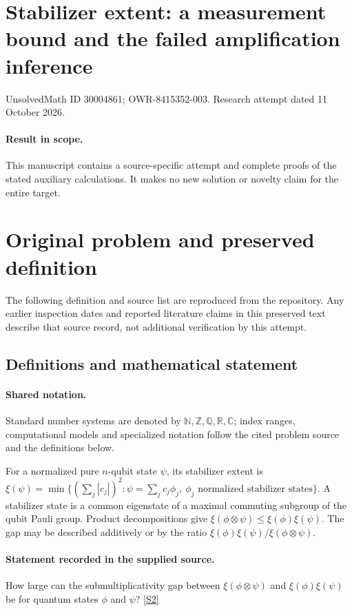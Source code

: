 \documentclass[11pt]{article}
\begin{document}
\section*{Stabilizer extent: a measurement bound and the failed amplification inference}
\noindent UnsolvedMath ID 30004861; OWR-8415352-003. Research attempt dated 11 October 2026.
\paragraph{Result in scope.}This manuscript contains a source-specific attempt and complete proofs of the stated auxiliary calculations. It makes no new solution or novelty claim for the entire target.
\section{Original problem and preserved definition}
The following definition and source list are reproduced from the repository. Any earlier inspection dates and reported literature claims in this preserved text describe that source record, not additional verification by this attempt.
\subsection{Definitions and mathematical statement}

\paragraph{Shared notation.}Standard number systems are denoted by $\mathbb N,\mathbb Z,\mathbb Q,\mathbb R,\mathbb C$; index ranges, computational models and specialized notation follow the cited problem source and the definitions below.


For a normalized pure $n$-qubit state $\psi$, its stabilizer extent is $\xi(\psi)=\min\{(\sum_j|c_j|)^2:\psi=\sum_jc_j\phi_j,\ \phi_j\text{ normalized stabilizer states}\}$. A stabilizer state is a common eigenstate of a maximal commuting subgroup of the qubit Pauli group. Product decompositions give $\xi(\phi\otimes\psi)\leq\xi(\phi)\xi(\psi)$. The gap may be described additively or by the ratio $\xi(\phi)\xi(\psi)/\xi(\phi\otimes\psi)$.
\paragraph{Statement recorded in the supplied source.}
How large can the submultiplicativity gap between $\xi(\phi\otimes\psi)$ and $\xi(\phi)\xi(\psi)$ be for quantum states $\phi$ and $\psi$? \href{https://doi.org/10.4171/owr/2021/49}{[S2]}
\end{document}
